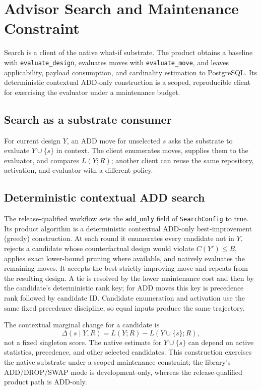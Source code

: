 \section{Advisor Search and Maintenance Constraint}

Search is a client of the native what-if substrate.  The product obtains a
baseline with
\texttt{evaluate\_design}, evaluates moves with \texttt{evaluate\_move}, and
leaves applicability, payload consumption, and cardinality estimation to
PostgreSQL.  Its deterministic contextual ADD-only construction is a scoped,
reproducible client for exercising the evaluator under a maintenance budget.

\subsection{Search as a substrate consumer}

For current design $Y$, an ADD move for unselected $s$ asks the substrate to
evaluate $Y\cup\{s\}$ in context.  The client enumerates moves, supplies them
to the evaluator, and compares $L(Y;R)$; another client can reuse the same
repository, activation, and evaluator with a different policy.

\subsection{Deterministic contextual ADD search}

The release-qualified workflow sets the \texttt{add\_only} field of
\texttt{SearchConfig} to true.  Its product algorithm is a
deterministic contextual ADD-only best-improvement (greedy) construction.  At
each round it enumerates every candidate not in $Y$, rejects a candidate whose
counterfactual design would violate $C(Y')\le B$, applies exact lower-bound
pruning where available, and natively evaluates the remaining moves.  It
accepts the best strictly improving move and repeats from the resulting
design.  A tie is resolved by the lower maintenance cost and then by the
candidate's deterministic rank key; for ADD moves this key is precedence rank
followed by candidate ID.  Candidate enumeration and activation use the same
fixed precedence discipline, so equal inputs produce the same trajectory.

The contextual marginal change for a candidate is
\[
 \Delta(s\mid Y,R)=L(Y;R)-L(Y\cup\{s\};R),
\]
not a fixed singleton score.  The native estimate for $Y\cup\{s\}$ can depend
on active statistics, precedence, and other selected candidates.  This
construction exercises the native substrate under a scoped maintenance
constraint; the library's ADD/DROP/SWAP mode is development-only, whereas the
release-qualified product path is ADD-only.

